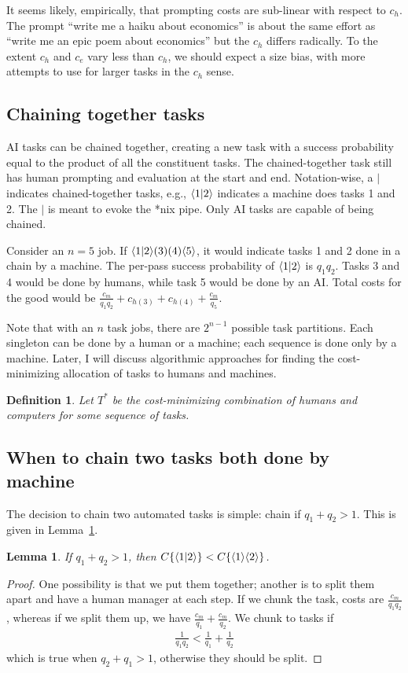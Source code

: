 \documentclass{article}
\newtheorem{lemma}[theorem]{Lemma}
\newtheorem{definition}[theorem]{Definition}
\begin{document}
It seems likely, empirically, that prompting costs are sub-linear with respect to $c_h$.
The prompt ``write me a haiku about economics'' is about the same effort as ``write me an epic poem about economics'' but the $c_h$ differs radically. 
To the extent $c_h$ and $c_e$ vary less than $c_h$, we should expect a size bias, with more attempts to use for larger tasks in the $c_h$ sense.  

\subsection{Chaining together tasks}
AI tasks can be chained together, creating a new task with a success probability equal to the product of all the constituent tasks.
The chained-together task still has human prompting and evaluation at the start and end.
Notation-wise, a $|$ indicates chained-together tasks, e.g.,  $\langle 1|2 \rangle$ indicates a machine does tasks 1 and 2.
The $|$ is meant to evoke the *nix pipe.
Only AI tasks are capable of being chained.

Consider an $n = 5$ job. 
If $\langle 1|2 \rangle( 3 )( 4 )\langle 5 \rangle$, it would indicate tasks 1 and 2 done in a chain by a machine.  
The per-pass success probability of $\langle 1|2 \rangle$ is $q_1q_2$. 
Tasks 3 and 4 would be done by humans, while task 5 would be done by an AI. 
Total costs for the good would be $\frac{c_m}{q_1 q_2} + c_{h(3)} + c_{h(4)} + \frac{c_m}{q_5}$.

Note that with an $n$ task jobs, there are $2^{n-1}$ possible task partitions.
Each singleton can be done by a human or a machine; each sequence is done only by a machine.
Later, I will discuss algorithmic approaches for finding the cost-minimizing allocation of tasks to humans and machines.

\begin{definition}
Let $T^*$ be the cost-minimizing combination of humans and computers for some sequence of tasks.
\end{definition}

\subsection{When to chain two tasks both done by machine}
The decision to chain two automated tasks is simple: chain if $q_1 + q_2 > 1$.
This is given in Lemma~\ref{lemma:chain}.

\begin{lemma} \label{lemma:chain}
If $q_1 + q_2 > 1$, then $C\{ \langle 1|2 \rangle \} < C\{ \langle 1 \rangle\langle 2 \rangle \}$.  
\end{lemma}
\begin{proof}
One possibility is that we put them together; another is to split them apart and have a human manager at each step.
If we chunk the task, costs are $\frac{c_m}{q_1q_2}$, whereas if we split them up, we have $\frac{c_m}{q_1} + \frac{c_m}{q_2}$.
We chunk to tasks if 
\begin{align}
\frac{1}{q_1 q_2} <\frac{1}{q_1} + \frac{1}{q_2}
\end{align}
which is true when $q_2 + q_1 > 1$, otherwise they should be split. 
\end{proof}
\end{document}
